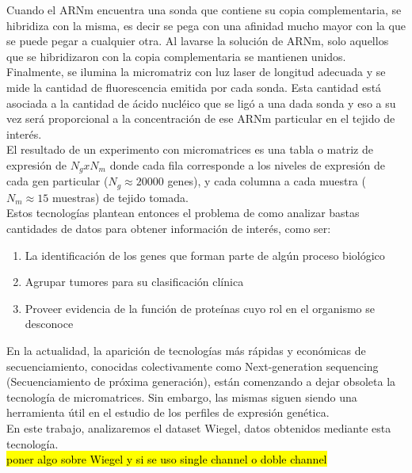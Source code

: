 Cuando el ARNm encuentra una sonda que contiene su copia complementaria, se hibridiza con la misma, es decir se pega con una afinidad mucho mayor con la que se puede pegar a cualquier otra. Al lavarse la solución de ARNm, solo aquellos que se hibridizaron con la copia complementaria se mantienen unidos. Finalmente, se ilumina la micromatriz con luz laser de longitud adecuada y se mide la cantidad de fluorescencia emitida por cada sonda. Esta cantidad está asociada a la cantidad de ácido nucléico que se ligó a una dada sonda y eso a su vez será proporcional a la concentración de ese ARNm particular en el tejido de interés.\\
El resultado de un experimento con micromatrices es una tabla o matriz de expresión de $N_g x N_m$ donde cada fila corresponde a los niveles de expresión de cada gen particular ($N_g \approx 20000$ genes), y cada columna a cada muestra ($N_m \approx 15$ muestras) de tejido tomada.\\
Estos tecnologías plantean entonces el problema de como analizar bastas cantidades de datos para obtener información de interés, como ser:
\begin{enumerate}
	\item La identificación de los genes que forman parte de algún proceso biológico
	\item Agrupar tumores para su clasificación clínica
	\item Proveer evidencia de la función de proteínas cuyo rol en el organismo se desconoce
\end{enumerate}
En la actualidad, la aparición de tecnologías más rápidas y económicas de secuenciamiento, conocidas colectivamente como Next-generation sequencing (Secuenciamiento de próxima generación), están comenzando a dejar obsoleta la tecnología de micromatrices. Sin embargo, las mismas siguen siendo una herramienta útil en el estudio de los perfiles de expresión genética.\\
En este trabajo, analizaremos el dataset Wiegel, datos obtenidos mediante esta tecnología.\\
\hl{poner algo sobre Wiegel y si se uso single channel o doble channel}
\cite{Babu2004}
\cite{Schulze2001}
\cite{Domany2003}
